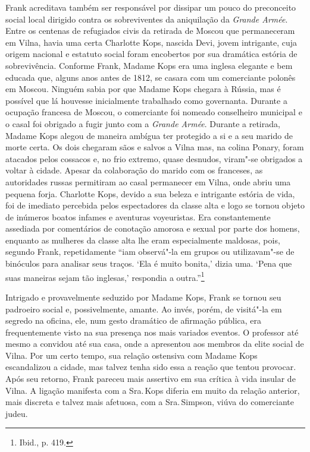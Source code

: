 Frank acreditava também ser responsável por dissipar um pouco do
preconceito social local dirigido contra os sobreviventes da aniquilação
da \textit{Grande Armée}. Entre os centenas de refugiados civis da
retirada de Moscou que permaneceram em Vilna, havia uma certa Charlotte
Kops, nascida Devi, jovem intrigante, cuja origem nacional e estatuto
social foram encobertos por sua dramática estória de sobrevivência.
Conforme Frank, Madame Kops era uma inglesa elegante e bem educada que,
alguns anos antes de 1812, se casara com um comerciante polonês em
Moscou. Ninguém sabia por que Madame Kops chegara à Rússia, mas é
possível que lá houvesse inicialmente trabalhado como governanta.
Durante a ocupação francesa de Moscou, o comerciante foi nomeado
conselheiro municipal e o casal foi obrigado a fugir junto com a
\textit{Grande Armée}. Durante a retirada, Madame Kops alegou de maneira
ambígua ter protegido a si e a seu marido de morte certa. Os dois
chegaram sãos e salvos a Vilna mas, na colina Ponary, foram atacados
pelos cossacos e, no frio extremo, quase desnudos, viram"-se obrigados a
voltar à cidade. Apesar da colaboração do marido com os franceses, as
autoridades russas permitiram ao casal permanecer em Vilna, onde abriu
uma pequena forja. Charlotte Kops, devido a sua beleza e intrigante
estória de vida, foi de imediato percebida pelos espectadores da classe
alta e logo se tornou objeto de inúmeros boatos infames e aventuras
voyeuristas. Era constantemente assediada por comentários de conotação
amorosa e sexual por parte dos homens, enquanto as mulheres da classe
alta lhe eram especialmente maldosas, pois, segundo Frank, repetidamente
``iam observá"-la em grupos ou utilizavam"-se de binóculos para analisar
seus traços. `Ela é muito bonita,' dizia uma. `Pena que suas maneiras
sejam tão inglesas,' respondia a outra.''\footnote{Ibid., p. 419.}

%

Intrigado e provavelmente seduzido por Madame Kops, Frank se tornou seu
padroeiro social e, possivelmente, amante. Ao invés, porém, de visitá"-la
em segredo na oficina, ele, num gesto dramático de afirmação pública,
era frequentemente visto na sua presença nos mais variados eventos. O
professor até mesmo a convidou até sua casa, onde a apresentou aos
membros da elite social de Vilna. Por um certo tempo, sua relação
ostensiva com Madame Kops escandalizou a cidade, mas talvez tenha sido
essa a reação que tentou provocar. Após seu retorno, Frank pareceu mais
assertivo em sua crítica à vida insular de Vilna. A ligação manifesta
com a Sra.\,Kops diferia em muito da relação anterior, mais discreta e
talvez mais afetuosa, com a Sra.\,Simpson, viúva do comerciante judeu.

